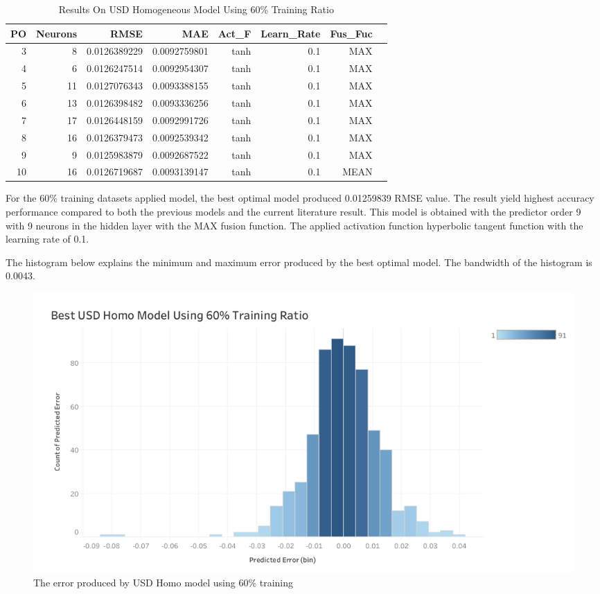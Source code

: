 {{{	\begin{table}[ht]
		\centering
		\begin{tabular}{@{}rrrrrrrr@{}}
			\toprule
			\textbf{PO}&\textbf{Neurons}& \textbf{RMSE} & \textbf{MAE} & \textbf{Act\_F}  & \textbf{Learn\_Rate} &\textbf{ Fus\_Fuc}\\ 
			\midrule
			   3 & 8 & 0.0126389229 & 0.0092759801 & tanh & 0.1 & MAX \\ 
			   4 & 6 & 0.0126247514 & 0.0092954307 & tanh & 0.1 & MAX \\ 
			   5 & 11 & 0.0127076343 & 0.0093388155 & tanh & 0.1 & MAX \\ 
			   6 & 13 & 0.0126398482 & 0.0093336256 & tanh & 0.1 & MAX \\ 
			   7 & 17 & 0.0126448159 & 0.0092991726 & tanh & 0.1 & MAX \\ 
			   8 & 16 & 0.0126379473 & 0.0092539342 & tanh & 0.1 & MAX \\ 
			   9 & 9 & 0.0125983879 & 0.0092687522 & tanh & 0.1 & MAX \\ 
			   10 & 16 & 0.0126719687 & 0.0093139147 & tanh & 0.1 & MEAN \\
			\hline
		\end{tabular}
		\hspace*{1cm}
		\caption{Results On USD Homogeneous Model Using 60\% Training Ratio}
	\end{table}
	
For the 60\% training datasets applied model, the best optimal model produced 0.01259839 RMSE value. The result yield highest  accuracy performance  compared to both the previous models and the current literature result. This model is obtained with the predictor order 9 with 9 neurons in the hidden layer with the MAX fusion function. The applied activation function hyperbolic tangent function with the learning rate of 0.1.
	
The histogram below explains the minimum and maximum error produced by the best optimal model. The bandwidth of the histogram is 0.0043.

\begin{figure}[hbt!]\centering
		\includegraphics[width=1\textwidth]{homo_usd_60}
		\caption{The error produced by USD Homo model using 60\% training}
\end{figure}
\pagebreak
	
}}}
